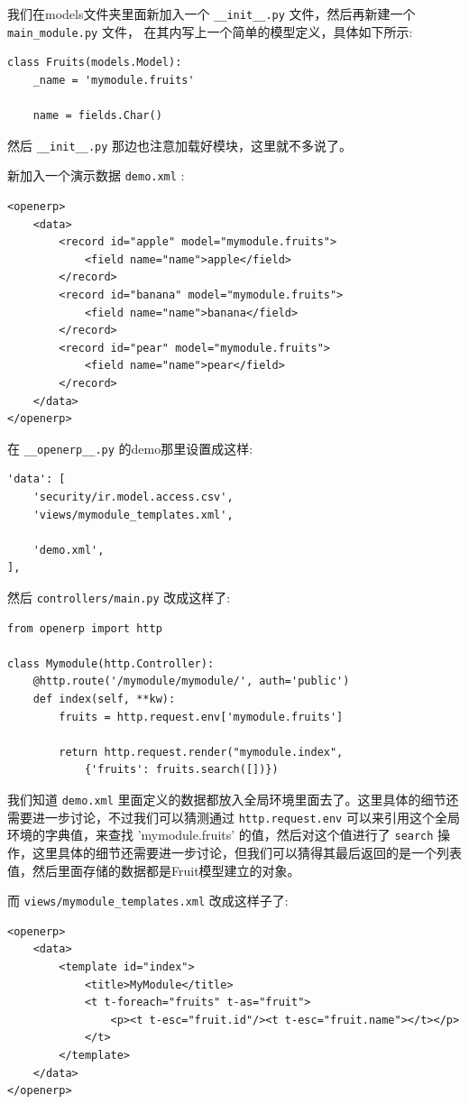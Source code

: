 \documentclass[11pt,a4paper]{sphinxmanual}
\begin{document}
我们在models文件夹里面新加入一个 \verb~__init__.py~ 文件，然后再新建一个 \verb~main_module.py~ 文件， 在其内写上一个简单的模型定义，具体如下所示:

\begin{verbatim}
class Fruits(models.Model):
    _name = 'mymodule.fruits'

    name = fields.Char()
\end{verbatim}

然后 \verb~__init__.py~ 那边也注意加载好模块，这里就不多说了。

新加入一个演示数据 \verb~demo.xml~ :

\begin{verbatim}
<openerp>
    <data>
        <record id="apple" model="mymodule.fruits">
            <field name="name">apple</field>
        </record>
        <record id="banana" model="mymodule.fruits">
            <field name="name">banana</field>
        </record>
        <record id="pear" model="mymodule.fruits">
            <field name="name">pear</field>
        </record>
    </data>
</openerp>
\end{verbatim}

在 \verb~__openerp__.py~ 的demo那里设置成这样:
\begin{Verbatim}
'data': [
    'security/ir.model.access.csv',
    'views/mymodule_templates.xml',

    'demo.xml',
],
\end{Verbatim}



然后 \verb~controllers/main.py~ 改成这样了:
\begin{verbatim}
from openerp import http

class Mymodule(http.Controller):
    @http.route('/mymodule/mymodule/', auth='public')
    def index(self, **kw):
        fruits = http.request.env['mymodule.fruits']

        return http.request.render("mymodule.index",
            {'fruits': fruits.search([])})
\end{verbatim}

我们知道 \verb~demo.xml~ 里面定义的数据都放入全局环境里面去了。这里具体的细节还需要进一步讨论，不过我们可以猜测通过 \verb~http.request.env~ 可以来引用这个全局环境的字典值，来查找 'mymodule.fruits' 的值，然后对这个值进行了 \verb~search~ 操作，这里具体的细节还需要进一步讨论，但我们可以猜得其最后返回的是一个列表值，然后里面存储的数据都是Fruit模型建立的对象。

而 \verb~views/mymodule_templates.xml~ 改成这样子了:
\begin{verbatim}
<openerp>
    <data>
        <template id="index">
            <title>MyModule</title>
            <t t-foreach="fruits" t-as="fruit">
                <p><t t-esc="fruit.id"/><t t-esc="fruit.name"></t></p>
            </t>
        </template>
    </data>
</openerp>
\end{verbatim}
\end{document}
